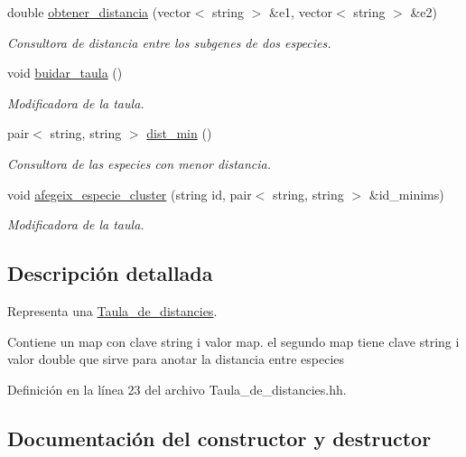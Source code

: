 \begin{DoxyCompactItemize}
double \hyperlink{class_taula__de__distancies_a53972d105426593de32bd70cdd297ccd}{obtener\+\_\+distancia} (vector$<$ string $>$ \&e1, vector$<$ string $>$ \&e2)
\begin{DoxyCompactList}\small\item\em Consultora de distancia entre los subgenes de dos especies. \end{DoxyCompactList}\item 
void \hyperlink{class_taula__de__distancies_afb9dd4b7cca03fd7da25d60a8603e765}{buidar\+\_\+taula} ()
\begin{DoxyCompactList}\small\item\em Modificadora de la taula. \end{DoxyCompactList}\item 
pair$<$ string, string $>$ \hyperlink{class_taula__de__distancies_a416612e603b4efafa816db9da4164b0b}{dist\+\_\+min} ()
\begin{DoxyCompactList}\small\item\em Consultora de las especies con menor distancia. \end{DoxyCompactList}\item 
void \hyperlink{class_taula__de__distancies_ae2fadcfa91e0c11028b0cec49ba77a0f}{afegeix\+\_\+especie\+\_\+cluster} (string id, pair$<$ string, string $>$ \&id\+\_\+minims)
\begin{DoxyCompactList}\small\item\em Modificadora de la taula. \end{DoxyCompactList}\end{DoxyCompactItemize}


\subsection{Descripción detallada}
Representa una \hyperlink{class_taula__de__distancies}{Taula\+\_\+de\+\_\+distancies}. 

Contiene un map con clave string i valor map. el segundo map tiene clave string i valor double que sirve para anotar la distancia entre especies 

Definición en la línea 23 del archivo Taula\+\_\+de\+\_\+distancies.\+hh.



\subsection{Documentación del constructor y destructor}
\mbox{\label{class_taula__de__distancies_a1524c765545a07965c2498d7d7be0c0d}} 
